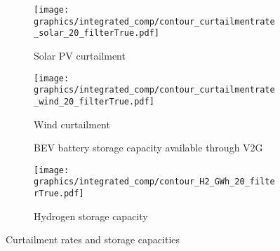 \begin{figure*}[h] %
    \centering
    \begin{subfigure}[b]{0.45\linewidth}
        \centering
        \texttt{[image: graphics/integrated\_comp/contour\_curtailmentrate\_solar\_20\_filterTrue.pdf]}
        \caption{Solar PV curtailment}
        \label{fig:solar_curt}
    \end{subfigure}
    \hfill
    \begin{subfigure}[b]{0.45\linewidth}
        \centering
        \texttt{[image: graphics/integrated\_comp/contour\_curtailmentrate\_wind\_20\_filterTrue.pdf]}
        \caption{Wind curtailment}
        \label{fig:wind_curt}
    \end{subfigure}
    \hfill
    \begin{subfigure}[b]{0.45\linewidth}
        \centering
        \caption{BEV battery storage capacity available through V2G}
        \label{fig:battery_cap}
    \end{subfigure}
    \hfill
    \begin{subfigure}[b]{0.45\linewidth}
        \centering
        \texttt{[image: graphics/integrated\_comp/contour\_H2\_GWh\_20\_filterTrue.pdf]}
        \caption{Hydrogen storage capacity}
        \label{fig:hystorage_cap}
    \end{subfigure}
    \hfill

    \caption{Curtailment rates and storage capacities}
    \label{fig:integration_options}
\end{figure*}

\clearpage